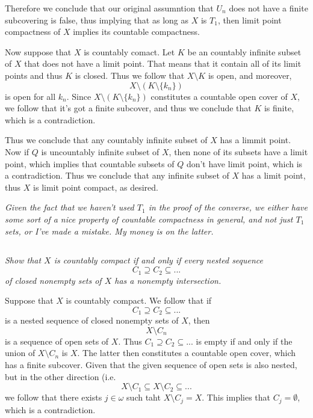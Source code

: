 \documentclass[11pt,oneside,titlepage]{book}
\newcommand{\set}[1]{\{ #1 \}}
\begin{document}
Therefore we conclude that our original assumntion that $U_n$ does not have a finite
subcovering is false, thus implying that as long as $X$ is $T_1$, then limit point
compactness of $X$ implies its countable compactness.

Now suppose that $X$ is countably comact. Let $K$ be an countably infinite subset of $X$
that does not have a limit point. That means that it contain all of its limit points
and thus $K$ is closed. Thus we follow that $X \setminus K$ is open, and moreover,
$$X \setminus (K \setminus \set{k_n})$$
is open for all $k_n$. Since $X \setminus (K \setminus \set{k_n})$ constitutes a
countable open cover of $X$, we follow that it's got a finite subcover, and thus we
conclude that $K$ is finite, which is a contradiction.

Thus we conclude that any countably infinite subset of $X$ has a limmit point. Now
if $Q$ is uncountably infinite subset of $X$, then none of its subsets have a limit point,
which implies that countable subsets of $Q$ don't have limit point, which is a contradiction. Thus
we conclude that any infinite subset of $X$ has a limit point, thus $X$ is limit point compact, as
desired.

\textit{Given the fact that we haven't used $T_1$ in the proof of the converse, we either
  have some sort of a nice property of countable compactness in general, and not just $T_1$
  sets, or I've made a mistake. My money is on the latter.}

\subsection{}

\textit{Show that $X$ is countably compact if and only if every nested sequence
  $$C_1 \supseteq C_2 \subseteq ... $$
  of closed nonempty sets of $X$ has a nonempty intersection.}

Suppose that $X$ is countably compact. We follow that if
$$C_1 \supseteq C_2 \subseteq ... $$
is a nested sequence of closed nonempty sets of $X$, then
$$X \setminus C_n$$
is a sequence of open sets of $X$. Thus $C_1 \supseteq C_2 \subseteq ... $ is empty if and only if
the union of $X \setminus C_n$ is $X$. The latter then constitutes a countable open cover,
which has a finite subcover. Given that the given sequence of open sets is also nested, but
in the other direction (i.e.
$$X \setminus C_1 \subseteq X \setminus C_2 \subseteq ...$$
we follow that there exists $j \in \omega$ such taht $X \setminus C_j = X$. This implies that
$C_j = \emptyset$, which is a contradiction.
\end{document}

